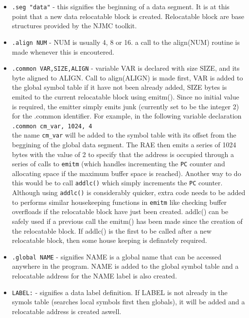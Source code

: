 \begin{itemize} 
\item 	\texttt{.seg "data"} - this signifies the beginning of a data segment.
It is at this point that a new data relocatable block is created.  
Relocatable block are base structures provided by the NJMC toolkit. 

\item	\texttt{.align NUM} - NUM is usually 4, 8 or 16.  
a call to the align(NUM) routine is made whenever this is encoutered. 

\item	\texttt{.common VAR,SIZE,ALIGN} - variable VAR is declared with 
size SIZE, and its byte aligned to ALIGN.  
Call to align(ALIGN) is made first, VAR is added to the global symbol 
table if it have not been already added, SIZE bytes
is emited to the current relocatable block using emitm().  Since no
initial value is required, the emitter simply emits junk (currently set to
be the integer 2) for the .common identifier.  For example, in the
following variable declaration \\ \texttt{.common cm\_var, 1024, 4} \\ the
name \texttt{cm\_var} will be added to the symbol table with its offset
from the beggining of the global data segment.  The RAE then emits a
series of 1024 bytes with the value of 2 to specify that the address is
occupied through a series of calls to \texttt{emitm} (which handles
incrementing the \texttt{PC} counter and allocating space if the maximum
buffer space is reached). Another way to do this would be to call
\texttt{addlc()} which simply increments the \texttt{PC} counter. 
Although using \texttt{addlc()} is considerably quicker, extra code needs
to be added to performs similar housekeeping functions in \texttt{emitm}
like checking buffer overfloads if the relocatable block have just been
created.  addlc() can be safely used if a previous call the emitm() has
been made since the creation of the relocatable block.  If addlc() is the
first to be called after a new relocatable block, then some house keeping
is definately required. 

\item	\texttt{.global NAME} - signifies NAME is a global name that can 
be accessed anywhere in the program.  
NAME is added to the global symbol table and a
relocatable address for the NAME label is also created. 

\item	\texttt{LABEL:} - signifies a data label definition.  
If LABEL is not already in
the symols table (searches local symbols first then globals), it will be
added and a relocatable address is created aswell. 



\end{itemize}
